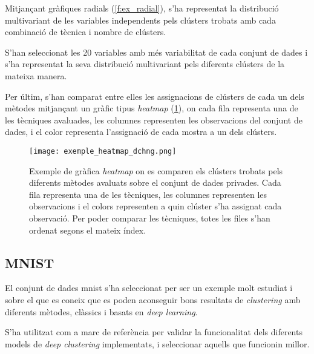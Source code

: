 \documentclass[CAT,BIB]{TFUOC}%
\begin{document}
        Mitjançant gràfiques radials  (\cref{f:ex_radial}),
        s'ha representat la distribució multivariant
        de les variables independents
        pels clústers trobats amb cada combinació de tècnica i nombre de clústers.

        S'han seleccionat les 20 variables amb més variabilitat de cada conjunt de dades
        i s'ha representat la seva distribució multivariant
        pels diferents clústers de la mateixa manera.



        Per últim,
        s'han comparat entre elles les assignacions de clústers de cada un dels mètodes
        mitjançant un gràfic tipus \textit{heatmap}  (\cref{f:ex_heatmap}),
        on cada fila representa una de les tècniques avaluades,
        les columnes representen les observacions del conjunt de dades,
        i el color representa l'assignació de cada mostra a un dels clústers.

        \begin{figure}
            \centering
            \texttt{[image: exemple\_heatmap\_dchng.png]}
            \caption[Exemple gràfica \textit{heatmap} de les assignacions de clústers]{
                Exemple de gràfica \textit{heatmap}
                on es comparen els clústers trobats pels diferents mètodes
                avaluats sobre el conjunt de dades \gls{privades}.
                Cada fila representa una de les tècniques,
                les columnes representen les observacions
                i el colors representen a quin clúster s'ha assignat cada observació.
                Per poder comparar les tècniques,
                totes les files s'han ordenat segons el mateix índex.
            }
            \label{f:ex_heatmap}
        \end{figure}


        \subsection{MNIST}
        \label{s:mnist}

            El conjunt de dades \gls{mnist}
            s'ha seleccionat per ser un exemple molt estudiat
            i sobre el que es coneix que
            es poden aconseguir bons resultats de \textit{clustering}
            amb diferents mètodes, clàssics i basats en \textit{deep learning}.

            S'ha utilitzat com a marc de referència
            per validar la funcionalitat
            dels diferents models de \textit{deep clustering} implementats,
            i seleccionar aquells que funcionin millor.
\end{document}
